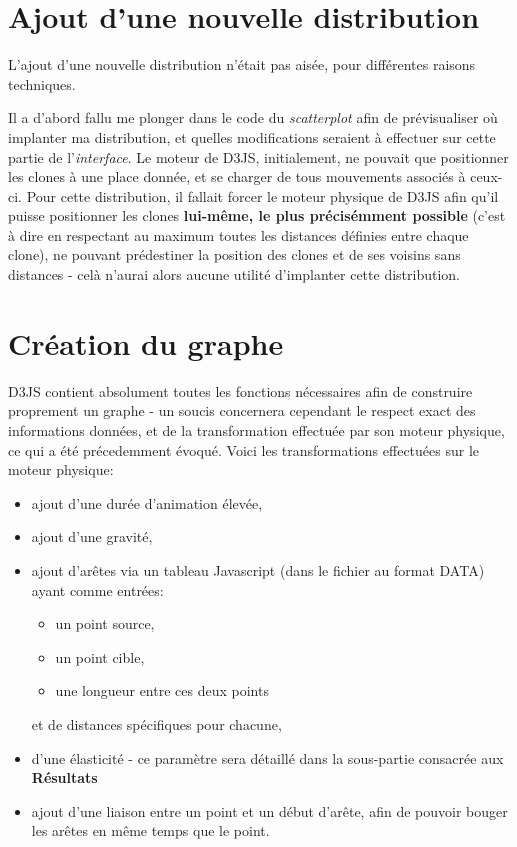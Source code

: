 \documentclass[pdftex,12pt,a4paper]{report}
\begin{document}
\begin{spacing}{1.2}
\section{Ajout d'une nouvelle distribution}
L'ajout d'une nouvelle distribution n'était pas aisée, pour différentes raisons techniques.

Il a d'abord fallu me plonger dans le code du \textit{scatterplot} afin de prévisualiser où implanter ma distribution, et quelles modifications seraient à effectuer sur cette partie de l'\textit{interface}. Le moteur de D3JS, initialement, ne pouvait que positionner les clones à une place donnée, et se charger de tous mouvements associés à ceux-ci. Pour cette distribution, il fallait forcer le moteur physique de D3JS afin qu'il puisse positionner les clones \textbf{lui-même, le plus précisémment possible} (c'est à dire en respectant au maximum toutes les distances définies entre chaque clone), ne pouvant prédestiner la position des clones et de ses voisins sans distances - celà n'aurai alors aucune utilité d'implanter cette distribution.

\section{Création du graphe}

D3JS contient absolument toutes les fonctions nécessaires afin de construire proprement un graphe - un soucis concernera cependant le respect exact des informations données, et de la transformation effectuée par son moteur physique, ce qui a été précedemment évoqué.
\newline
Voici les transformations effectuées sur le moteur physique:
\begin{itemize}
\item{ajout d'une durée d'animation élevée,}
\item{ajout d'une gravité,}
\item{ajout d'arêtes via un tableau Javascript (dans le fichier au format DATA) ayant comme entrées:	
\begin{itemize}
\item{un point source,}
\item{un point cible,}
\item{une longueur entre ces deux points}
\end{itemize}
et de distances spécifiques pour chacune,}
\item{d'une élasticité - ce paramètre sera détaillé dans la sous-partie consacrée aux \textbf{Résultats}}
\item{ajout d'une liaison entre un point et un début d'arête, afin de pouvoir bouger les arêtes en même temps que le point.}
\end{itemize}


\end{spacing}
\end{document}
